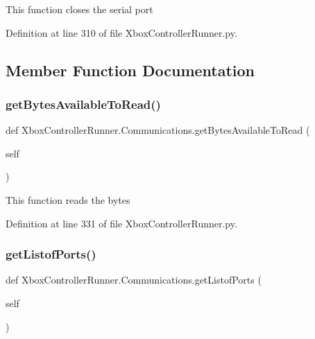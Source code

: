 \begin{DoxyVerb}This function closes the serial port\end{DoxyVerb}
 

Definition at line 310 of file Xbox\+Controller\+Runner.\+py.



\subsection{Member Function Documentation}
\mbox{\label{class_xbox_controller_runner_1_1_communications_a100a64229f39d8fa0fb7801a22104412}} 
\subsubsection{\texorpdfstring{get\+Bytes\+Available\+To\+Read()}{getBytesAvailableToRead()}}
{\footnotesize\ttfamily def Xbox\+Controller\+Runner.\+Communications.\+get\+Bytes\+Available\+To\+Read (\begin{DoxyParamCaption}\item[{}]{self }\end{DoxyParamCaption})}

\begin{DoxyVerb}This function reads the bytes\end{DoxyVerb}
 

Definition at line 331 of file Xbox\+Controller\+Runner.\+py.

\mbox{\label{class_xbox_controller_runner_1_1_communications_a091dd6d34bf96a15c67a8e87d7333515}} 
\subsubsection{\texorpdfstring{get\+Listof\+Ports()}{getListofPorts()}}
{\footnotesize\ttfamily def Xbox\+Controller\+Runner.\+Communications.\+get\+Listof\+Ports (\begin{DoxyParamCaption}\item[{}]{self }\end{DoxyParamCaption})}

